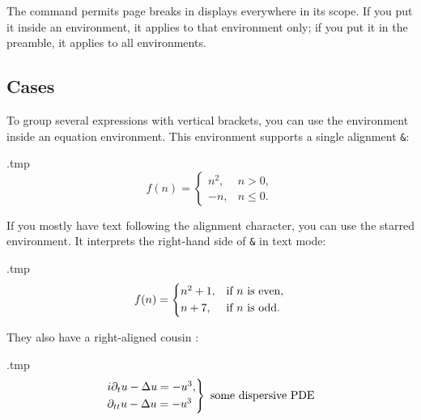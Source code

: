 The  command permits page breaks in displays everywhere in its scope.
If you put it inside an environment, it applies to that environment only;
if you put it in the preamble, it applies to all environments.


%
%
\subsection{Cases}

To group several expressions with vertical brackets,
you can use the  environment inside an equation environment.
This environment supports a single alignment \verb|&|:
%
\begin{VerbatimOut}{\jobname.tmp}
\begin{equation}
f(n) = \begin{cases}
    n^2, & n > 0,\\
    -n, & n \leq 0.
\end{cases}
\end{equation}
\end{VerbatimOut}
\ShowExample
%
If you mostly have text following the alignment character,
you can use the starred environment.
It interprets the right-hand side of \verb|&| in text mode:
%
\begin{VerbatimOut}{\jobname.tmp}
\begin{equation}
f(n) = \begin{cases*}
    n^2+1, & if $n$ is even,\\
    n+7, & if $n$ is odd.
\end{cases*}
\end{equation}
\end{VerbatimOut}
\ShowExample

They also have a right-aligned cousin :
%
\begin{VerbatimOut}{\jobname.tmp}
\begin{equation}
\begin{rcases}
i \partial_t u - \Delta u = -u^3,\\
\partial_{tt} u - \Delta u = -u^3
\end{rcases}
\text{ some dispersive PDE}
\end{equation}
\end{VerbatimOut}
\ShowExampleBelow

